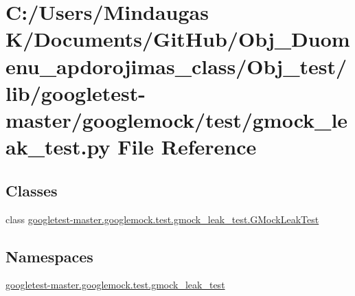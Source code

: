 \hypertarget{_obj__test_2lib_2googletest-master_2googlemock_2test_2gmock__leak__test_8py}{}\section{C\+:/\+Users/\+Mindaugas K/\+Documents/\+Git\+Hub/\+Obj\+\_\+\+Duomenu\+\_\+apdorojimas\+\_\+class/\+Obj\+\_\+test/lib/googletest-\/master/googlemock/test/gmock\+\_\+leak\+\_\+test.py File Reference}
\label{_obj__test_2lib_2googletest-master_2googlemock_2test_2gmock__leak__test_8py}
\subsection*{Classes}
\begin{DoxyCompactItemize}
\item 
class \mbox{\hyperlink{classgoogletest-master_1_1googlemock_1_1test_1_1gmock__leak__test_1_1_g_mock_leak_test}{googletest-\/master.\+googlemock.\+test.\+gmock\+\_\+leak\+\_\+test.\+G\+Mock\+Leak\+Test}}
\end{DoxyCompactItemize}
\subsection*{Namespaces}
\begin{DoxyCompactItemize}
\item 
 \mbox{\hyperlink{namespacegoogletest-master_1_1googlemock_1_1test_1_1gmock__leak__test}{googletest-\/master.\+googlemock.\+test.\+gmock\+\_\+leak\+\_\+test}}
\end{DoxyCompactItemize}
